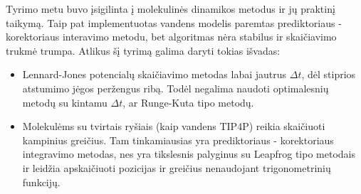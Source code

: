 Tyrimo metu buvo įsigilinta į molekulinės dinamikos metodus ir jų praktinį taikymą.
Taip pat implementuotas vandens modelis paremtas prediktoriaus - korektoriaus interavimo metodu,
bet algoritmas nėra stabilus ir skaičiavimo trukmė trumpa.
Atlikus šį tyrimą galima daryti tokias išvadas:

\begin{itemize}
    \item Lennard-Jones potencialų skaičiavimo metodas labai jautrus \({\Delta}t\), dėl stiprios atstumimo jėgos peržengus ribą.
        Todėl negalima naudoti optimalesnių metodų su kintamu \({\Delta}t\), ar Runge-Kuta tipo metodų.

    \item Molekulėms su tvirtais ryšiais (kaip vandens TIP4P) reikia skaičiuoti kampinius greičius.
        Tam tinkamiausias yra prediktoriaus - korektoriaus integravimo metodas, nes yra tikslesnis palyginus su Leapfrog tipo metodais
        ir leidžia apskaičiuoti pozicijas ir greičius nenaudojant trigonometrinių funkcijų.
\end{itemize}
